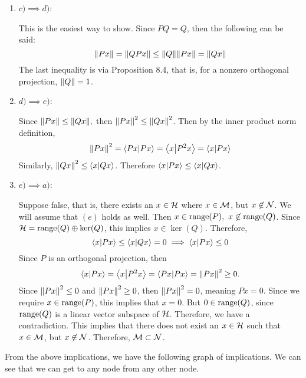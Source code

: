 \begin{solution}
\begin{enumerate}
        \item[] \underline{$c) \implies d)$}:

        \hop
        This is the easiest way to show. Since $PQ = Q$, then the following can be said:
        \[\norm{Px} = \norm{QPx} \leq \norm{Q}\norm{Px} = \norm{Qx}\]
        The last inequality is via Proposition 8.4, that is, for a nonzero orthogonal projection, $\norm{Q} = 1$. 

        \item[] \underline{$d) \implies e)$}:

        \hop
        Since $\norm{Px} \leq \norm{Qx},$ then $\norm{Px}^2 \leq \norm{Qx}^2$. Then by the inner product norm definition, 
        \[\norm{Px}^2 = \braket{Px}{Px} = \braket{x}{P^2x} = \braket{x}{Px}\]
        Similarly, $\norm{Qx}^2 \leq \braket{x}{Qx}$. Therefore $\braket{x}{Px} \leq \braket{x}{Qx}$.

        \newpage
        \item[] \underline{$e) \implies a)$}:

        \hop
        Suppose false, that is, there exists an $x \in \scH$ where $x \in \scM$, but $x \not\in \scN$. We will assume that $(e)$ holds as well. Then $x \in \range (P), \ x\not \in \range(Q)$. Since $\scH = \range (Q) \oplus \ker (Q)$, this implies $x \in \ker(Q)$.  Therefore, 
        \[\braket{x}{Px} \leq \braket{x}{Qx} = 0 \implies \braket{x}{Px} \leq 0\]
        Since $P$ is an orthogonal projection, then 
        \[\braket{x}{Px} = \braket{x}{P^2x} = \braket{Px}{Px} = \norm{Px}^2 \geq 0.\]
        Since $\norm{Px}^2 \leq 0$ and $\norm{Px}^2 \geq 0$, then $\norm{Px}^2 = 0$, meaning $Px = 0$. Since we require $x \in \range(P)$, this implies that $x = 0$. But $0 \in \range(Q)$, since $\range(Q)$ is a linear vector subspace of $\scH$. Therefore, we have a contradiction. This implies that there does not exist an $x \in \scH$ such that $x \in \scM$, but $x \not \in \scN$. Therefore, $\scM \subset \scN$. 
    \end{enumerate}

    From the above implications, we have the following graph of implications. We can see that we can get to any node from any other node. 
    \usetikzlibrary {graphs}
    \usetikzlibrary{positioning, arrows.meta, bending}
    \renewcommand{\d}{2.5}
    \begin{center}
        \begin{tikzpicture}[
            node distance=2cm,
            arrow/.style={-Stealth, shorten >=1pt, shorten <=1pt},
            mynode/.style={draw, circle, fill=lightgray},
            edgelabel/.style={font=\footnotesize, sloped}
            ]
            

\end{tikzpicture}
\end{center}
\end{solution}
